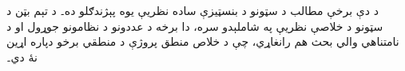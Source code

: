\documentclass[../../include/open-logic-part]{subfiles}
\begin{document}

\begin{editorial}
  د دې برخې مطالب د سټونو د بنسټيزې ساده نظريې يوه پېژندګلو ده۔ د تېم بټن د سټونو د خلاصې نظريې په شاملېدو سره، دا برخه د عددونو د نظامونو جوړول او د نامتناهي والي بحث هم رانغاړي، چې د خلاص منطق پروژې د منطقي برخو دپاره اړين نۀ دي۔
\end{editorial}







\OLEndPartHook
\end{document}
